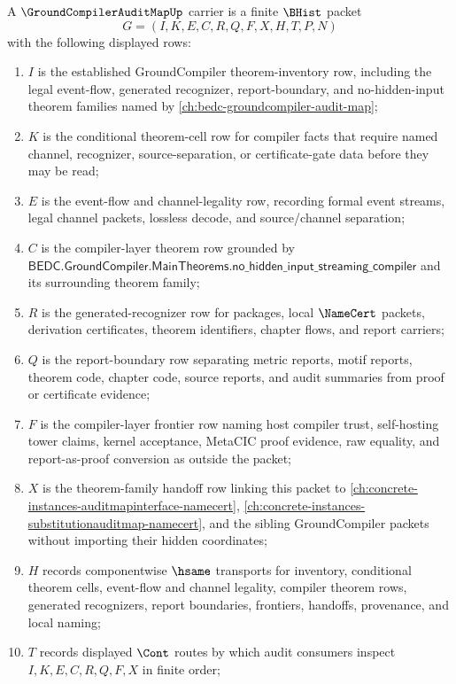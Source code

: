 \begin{definition}
\label{def:ground-compiler-audit-map-carrier}
A $\GroundCompilerAuditMapUp$ carrier is a finite $\BHist$ packet
$$
G=(I,K,E,C,R,Q,F,X,H,T,P,N)
$$
with the following displayed rows:
\begin{enumerate}
\item $I$ is the established GroundCompiler theorem-inventory row, including the legal event-flow, generated recognizer, report-boundary, and no-hidden-input theorem families named by \autoref{ch:bedc-groundcompiler-audit-map};
\item $K$ is the conditional theorem-cell row for compiler facts that require named channel, recognizer, source-separation, or certificate-gate data before they may be read;
\item $E$ is the event-flow and channel-legality row, recording formal event streams, legal channel packets, lossless decode, and source/channel separation;
\item $C$ is the compiler-layer theorem row grounded by $\mathsf{BEDC.GroundCompiler.MainTheorems.no\_hidden\_input\_streaming\_compiler}$ and its surrounding theorem family;
\item $R$ is the generated-recognizer row for packages, local $\NameCert$ packets, derivation certificates, theorem identifiers, chapter flows, and report carriers;
\item $Q$ is the report-boundary row separating metric reports, motif reports, theorem code, chapter code, source reports, and audit summaries from proof or certificate evidence;
\item $F$ is the compiler-layer frontier row naming host compiler trust, self-hosting tower claims, kernel acceptance, MetaCIC proof evidence, raw equality, and report-as-proof conversion as outside the packet;
\item $X$ is the theorem-family handoff row linking this packet to \autoref{ch:concrete-instances-auditmapinterface-namecert}, \autoref{ch:concrete-instances-substitutionauditmap-namecert}, and the sibling GroundCompiler packets without importing their hidden coordinates;
\item $H$ records componentwise $\hsame$ transports for inventory, conditional theorem cells, event-flow and channel legality, compiler theorem rows, generated recognizers, report boundaries, frontiers, handoffs, provenance, and local naming;
\item $T$ records displayed $\Cont$ routes by which audit consumers inspect $I,K,E,C,R,Q,F,X$ in finite order;

\end{enumerate}
\end{definition}
